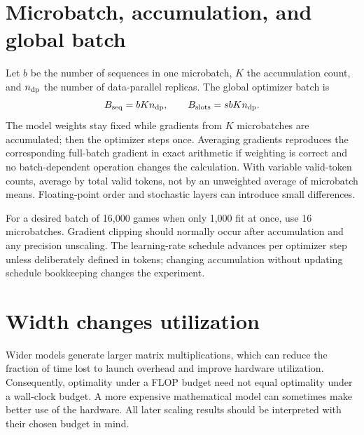 \section{Microbatch, accumulation, and global batch}
Let $b$ be the number of sequences in one microbatch, $K$ the accumulation count, and $n_{\rm dp}$ the number of data-parallel replicas. The global optimizer batch is
\begin{equation}
 B_{\rm seq}=bK n_{\rm dp},\qquad B_{\rm slots}=s bK n_{\rm dp}.
\end{equation}
The model weights stay fixed while gradients from $K$ microbatches are accumulated; then the optimizer steps once. Averaging gradients reproduces the corresponding full-batch gradient in exact arithmetic if weighting is correct and no batch-dependent operation changes the calculation. With variable valid-token counts, average by total valid tokens, not by an unweighted average of microbatch means. Floating-point order and stochastic layers can introduce small differences.


For a desired batch of 16,000 games when only 1,000 fit at once, use 16 microbatches. Gradient clipping should normally occur after accumulation and any precision unscaling. The learning-rate schedule advances per optimizer step unless deliberately defined in tokens; changing accumulation without updating schedule bookkeeping changes the experiment.

\section{Width changes utilization}
Wider models generate larger matrix multiplications, which can reduce the fraction of time lost to launch overhead and improve hardware utilization. Consequently, optimality under a FLOP budget need not equal optimality under a wall-clock budget. A more expensive mathematical model can sometimes make better use of the hardware. All later scaling results should be interpreted with their chosen budget in mind.

